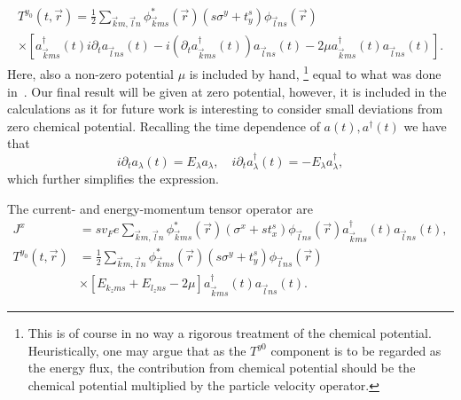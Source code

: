 \begin{multline}
    T^{y_0}(t, \vec{r}) =
    \frac{1}{2}
    \sum\limits_{\vec{k} m, \vec{l} n}^{}
    \phi ^{*}_{\vec{k} m s}(\vec{r}) (s \sigma^y + t^s_y) \phi _{\vec{l} n s }(\vec{r})\\
    \times \left[
      a^{\dagger}_{\vec{k} m s}(t) i \partial_t  a_{\vec{l} n s}(t)
      -
      i \left(\partial_t a^{\dagger}_{\vec{k} ms }(t) \right) a_{\vec{l} n s}(t)
      -  2\mu  a^{\dagger}_{\vec{k} m s}(t) a_{\vec{l} n s}(t)
        \right].
\end{multline}
Here, also a non-zero potential $\mu $ is included by hand,%
\footnote{This is of course in no way a rigorous treatment of the chemical potential. Heuristically, one may argue that as the \( T^{y0} \) component is to be regarded as the energy flux, the contribution from chemical potential should be the chemical potential multiplied by the particle velocity operator. }
equal to what was done in~\textcite{arjonaFingerprintsConformalAnomaly2019}.
Our final result will be given at zero potential, however, it is included in the calculations as it for future work is interesting to consider small deviations from zero chemical potential.
Recalling the time dependence of $a(t), a^{\dagger}(t)$ we have that
\[
  i \partial_t a_{\lambda }(t) = E_{\lambda }a_{\lambda },
  \quad
  i \partial_t a^{\dagger}_{\lambda }(t) = -E_{\lambda }a^{\dagger}_{\lambda },
\]
which further simplifies the expression.

\begin{summary}
  The current- and energy-momentum tensor operator are
  \begin{align}
    J^x &= sv_F e \sum\limits_{\vec{k}m, \vec{l}n}^{}
          \phi _{\vec{k}ms}^{*}(\vec{r}) \left(\sigma^x + s t^s_x\right) \phi _{\vec{l}ns}(\vec{r})
          a_{\vec{k}ms}^{\dagger}(t)
          a_{\vec{l}ns}(t),\\
    T^{y_0}(t, \vec{r}) &=
                          \frac{1}{2}
                          \sum\limits_{\vec{k} m, \vec{l} n}^{}
                          \phi ^{*}_{\vec{k} m s}(\vec{r}) (s \sigma^y + t^s_y) \phi _{\vec{l} n s }(\vec{r})\\
\nonumber        &\times \left[
                   E_{k_z m s} + E_{l_z n s} - 2\mu \right]
                   a^{\dagger}_{\vec{k} m s}(t)  a_{\vec{l} n s}(t).
  \end{align}
\end{summary}

